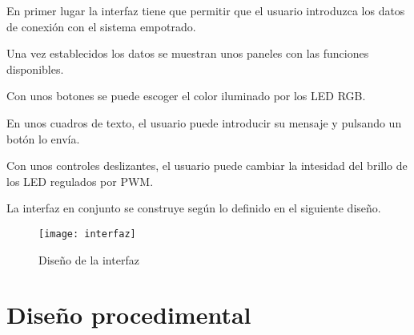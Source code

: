 En primer lugar la interfaz tiene que permitir que el usuario introduzca
los datos de conexión con el sistema empotrado.


Una vez establecidos los datos se muestran unos paneles con las funciones
disponibles.

Con unos botones se puede escoger el color iluminado por los LED RGB.


En unos cuadros de texto, el usuario puede introducir su mensaje y pulsando
un botón lo envía.

Con unos controles deslizantes, el usuario puede cambiar la intesidad del brillo
de los LED regulados por PWM.

La interfaz en conjunto se construye según lo definido en el siguiente diseño.

\begin{figure}[H]
  \centering
  \texttt{[image: interfaz]}
  \caption{Diseño de la interfaz} \label{fig:intefaz}
\end{figure}

\section{Diseño procedimental}
